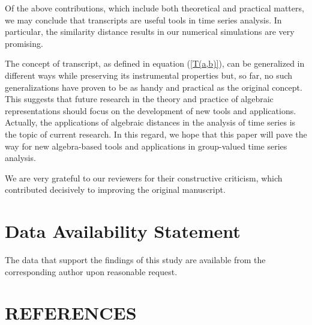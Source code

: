 \documentclass[%
 aip,
 amsmath,amssymb,
 reprint,%
]{revtex4-1}
\begin{document}
Of the above contributions, which include both theoretical and practical matters, we may conclude that transcripts are useful tools in time series analysis. In particular, the similarity distance results in our numerical simulations are very promising.    

The concept of transcript, as defined in equation (\ref{T(a,b)}), can be
generalized in different ways while preserving its instrumental properties
but, so far, no such generalizations have proven to be as handy and
practical as the original concept. This suggests that future research in the
theory and practice of algebraic representations should focus on the
development of new tools and applications. Actually, the applications of
algebraic distances in the analysis of time series is the topic of current
research. In this regard, we hope that this paper will pave the way for
new algebra-based tools and applications in
group-valued time series analysis.




\begin{acknowledgments}
We are very grateful to our reviewers for their constructive criticism, which contributed decisively to improving the original manuscript.
\end{acknowledgments}


\section*{Data Availability Statement}
The data that support the findings of this study are available from the corresponding author upon reasonable request.




\section*{REFERENCES}
\end{document}
